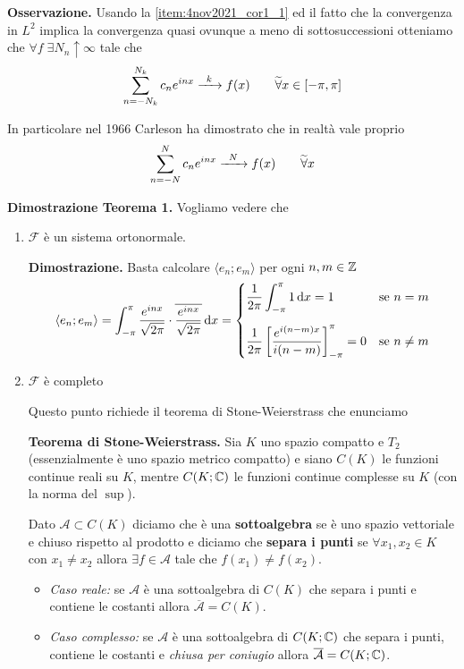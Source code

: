 \textbf{Osservazione.}
Usando la \ref{item:4nov2021_cor1_1} ed il fatto che la convergenza in $L^2$ implica la convergenza quasi ovunque a meno di sottosuccessioni otteniamo che $\forall f \; \exists N_n \uparrow \infty$ tale che
$$
\sum_{n = -N_k}^{N_k} c_n e^{inx} \xrightarrow{\;\;k\;\;} f(x) \qquad \widetilde\forall x \in [-\pi, \pi]
$$

In particolare nel 1966 Carleson ha dimostrato che in realtà vale proprio
$$
\sum_{n = -N}^N c_n e^{inx} \xrightarrow{\;\;N\;\;} f(x) \qquad \widetilde\forall x
$$

\textbf{Dimostrazione Teorema 1.}
Vogliamo vedere che
\begin{enumerate}
	\item $\mathcal F$ è un sistema ortonormale.

		\textbf{Dimostrazione.}
		Basta calcolare $\langle e_n; e_m \rangle$ per ogni $n, m \in \mathbb Z$
		$$
		\langle e_n; e_m \rangle
		= \int_{-\pi}^\pi \frac{e^{inx}}{\sqrt{2\pi}} \cdot \overline{\frac{e^{inx}}{\sqrt{2\pi}}} \,\mathrm{d} x
		=
		\begin{cases}
			\displaystyle \frac{1}{2\pi} \int_{-\pi}^\pi 1 \,\mathrm{d} x = 1 & \text{se } n = m \\[15pt]
			\displaystyle \frac{1}{2\pi} \left[ \frac{e^{i(n - m)x}}{i(n - m)} \right]_{-\pi}^\pi = 0& \text{se } n \neq m \\
		\end{cases}
		$$

	\item $\mathcal F$ è completo

		Questo punto richiede il teorema di Stone-Weierstrass che enunciamo

		\textbf{Teorema di Stone-Weierstrass.}
		Sia $K$ uno spazio compatto e $T_2$ (essenzialmente è uno spazio metrico compatto) e siano $C(K)$ le funzioni continue reali su $K$, mentre $C(K; \mathbb C)$ le funzioni continue complesse su $K$ (con la norma del $\sup$).

		Dato $\mathcal A \subset C(K)$ diciamo che è una \textbf{sottoalgebra} se è uno spazio vettoriale e chiuso rispetto al prodotto e diciamo che \textbf{separa i punti} se $\forall x_1, x_2 \in K$ con $x_1 \neq x_2$ allora $\exists f \in \mathcal A$ tale che $f(x_1) \neq f(x_2)$.
		\begin{itemize}
			\item \textit{Caso reale:}
			se $\mathcal A$ è una sottoalgebra di $C(K)$ che separa i punti e contiene le costanti allora $\overline{\mathcal A} = C(K)$.
			
			\item \textit{Caso complesso:}
			se $\mathcal A$ è una sottoalgebra di $C(K; \mathbb C)$ che separa i punti, contiene le costanti e \textit{chiusa per coniugio} allora $\overline{\mathcal A} = C(K; \mathbb C)$.
			

\end{itemize}
\end{enumerate}
